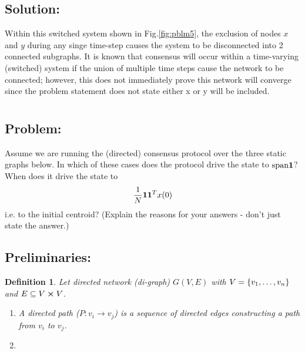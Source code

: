 \documentclass[]{article}
\numberwithin{equation}{section}
\renewcommand{\figurename}{Fig.}
\newtheorem{definition}{Definition}
\begin{document}

\subsection*{Solution:}
Within this switched system shown in \figurename \ref{fig:pblm5}, the exclusion of nodes $x$ and $y$ during any singe time-step causes the system to be disconnected into 2 connected subgraphs. 
It is known that consensus will occur within a time-varying (switched) system if the union of multiple time steps cause the network to be connected; 
however, this does not immediately prove this network will converge since the problem statement does not state either x or y will be included.

\newpage
\section{}
\subsection*{Problem:}
Assume we are running the (directed) consensus protocol over the three static graphs below.
In which of these cases does the protocol drive the state to $\text{span}\vb{1}$?
When does it drive the state to \[
    \frac{1}{N} \vb{1} \vb{1}^T x(0)
\] i.e. to the initial centroid?
(Explain the reasons for your answers - don't just state the answer.)

\subsection*{Preliminaries:}
\begin{definition} 
    Let directed network (di-graph) $G(V,E)$ with $V = \qty{v_1,\dots,v_n}$ and $E \subseteq V \cross V$.
    \begin{enumerate}
        \item A directed path ($P : v_i \to v_j$) is a sequence of directed edges constructing a path from $v_i$ to $v_j$.
        \item 
    \end{enumerate}
\end{definition}
\end{document}
